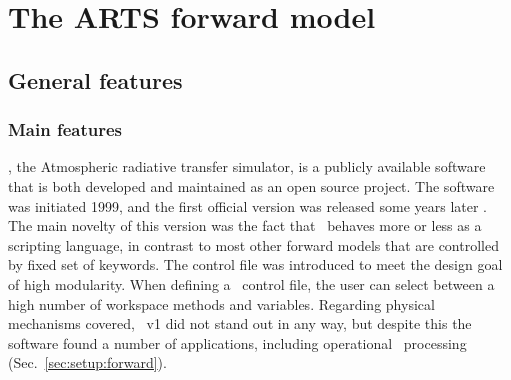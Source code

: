 \chapter{The ARTS forward model}
\label{chapter:arts}


\section{General features}
\label{sec:arts:features}

\subsection{Main features}
%
\ARTS, the Atmospheric radiative transfer simulator, is a publicly available
software that is both developed and maintained as an open source project. The
software was initiated 1999, and the first official version was released some
years later \citep{buehler:artst:05}. The main novelty of this version was the
fact that \ARTS\ behaves more or less as a scripting language, in contrast to
most other forward models that are controlled by fixed set of keywords. The
control file was introduced to meet the design goal of high modularity. When
defining a \ARTS\ control file, the user can select between a high number of
workspace methods and variables. Regarding physical mechanisms covered, \ARTS\
v1 did not stand out in any way, but despite this the software found a number
of applications, including operational \SMR\ processing
(Sec.~\ref{sec:setup:forward}).


